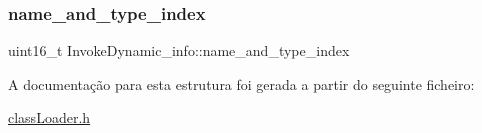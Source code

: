 \subsubsection{\texorpdfstring{name\+\_\+and\+\_\+type\+\_\+index}{name\_and\_type\_index}}
{\footnotesize\ttfamily uint16\+\_\+t Invoke\+Dynamic\+\_\+info\+::name\+\_\+and\+\_\+type\+\_\+index}



A documentação para esta estrutura foi gerada a partir do seguinte ficheiro\+:\begin{DoxyCompactItemize}
\item 
\hyperlink{class_loader_8h}{class\+Loader.\+h}\end{DoxyCompactItemize}
